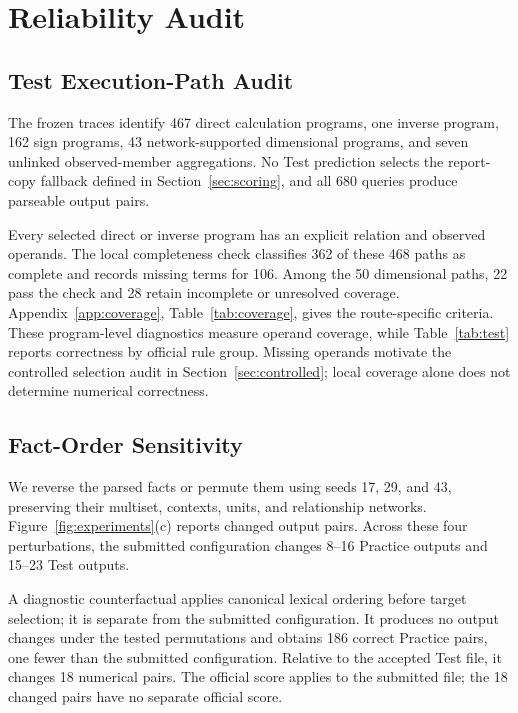 \documentclass[conference]{IEEEtran}
\begin{document}
\section{Reliability Audit}
\label{sec:reliability}

\subsection{Test Execution-Path Audit}

The frozen traces identify 467 direct calculation programs, one inverse program, 162 sign programs, 43 network-supported dimensional programs, and seven unlinked observed-member aggregations. No Test prediction selects the report-copy fallback defined in Section~\ref{sec:scoring}, and all 680 queries produce parseable output pairs.

Every selected direct or inverse program has an explicit relation and observed operands. The local completeness check classifies 362 of these 468 paths as complete and records missing terms for 106. Among the 50 dimensional paths, 22 pass the check and 28 retain incomplete or unresolved coverage. Appendix~\ref{app:coverage}, Table~\ref{tab:coverage}, gives the route-specific criteria. These program-level diagnostics measure operand coverage, while Table~\ref{tab:test} reports correctness by official rule group. Missing operands motivate the controlled selection audit in Section~\ref{sec:controlled}; local coverage alone does not determine numerical correctness.

\subsection{Fact-Order Sensitivity}
\label{sec:order}

We reverse the parsed facts or permute them using seeds 17, 29, and 43, preserving their multiset, contexts, units, and relationship networks. Figure~\ref{fig:experiments}(c) reports changed output pairs. Across these four perturbations, the submitted configuration changes 8--16 Practice outputs and 15--23 Test outputs.

A diagnostic counterfactual applies canonical lexical ordering before target selection; it is separate from the submitted configuration. It produces no output changes under the tested permutations and obtains 186 correct Practice pairs, one fewer than the submitted configuration. Relative to the accepted Test file, it changes 18 numerical pairs. The official score applies to the submitted file; the 18 changed pairs have no separate official score.
\end{document}
